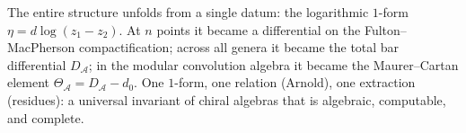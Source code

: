\documentclass[11pt,reqno]{amsart}
\theoremstyle{definition}
\theoremstyle{remark}
\providecommand{\cA}{\mathcal{A}}
\numberwithin{equation}{section}
\begin{document}
\bigskip

\noindent
The entire structure unfolds from a single datum: the
logarithmic $1$-form $\eta = d\log(z_1 - z_2)$. At $n$ points
it became a differential on the Fulton--MacPherson
compactification; across all genera it became the total bar
differential $D_\cA$; in the modular convolution algebra it
became the Maurer--Cartan element $\Theta_\cA = D_\cA - d_0$.
One $1$-form, one relation (Arnold), one extraction (residues):
a universal invariant of chiral algebras that is algebraic,
computable, and complete.
\end{document}
